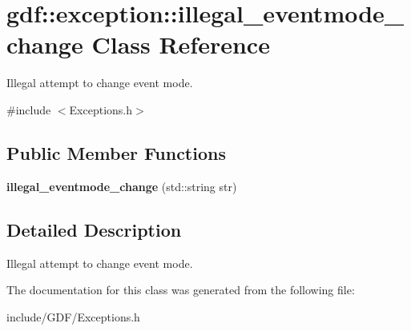 \hypertarget{classgdf_1_1exception_1_1illegal__eventmode__change}{
\section{gdf::exception::illegal\_\-eventmode\_\-change Class Reference}
\label{classgdf_1_1exception_1_1illegal__eventmode__change}
}


Illegal attempt to change event mode.  




{\ttfamily \#include $<$Exceptions.h$>$}

\subsection*{Public Member Functions}
\begin{DoxyCompactItemize}
\item 
\hypertarget{classgdf_1_1exception_1_1illegal__eventmode__change_ade675c9801b3f6cf5f8664a41b13abfb}{
{\bfseries illegal\_\-eventmode\_\-change} (std::string str)}
\label{classgdf_1_1exception_1_1illegal__eventmode__change_ade675c9801b3f6cf5f8664a41b13abfb}

\end{DoxyCompactItemize}


\subsection{Detailed Description}
Illegal attempt to change event mode. 

The documentation for this class was generated from the following file:\begin{DoxyCompactItemize}
\item 
include/GDF/Exceptions.h\end{DoxyCompactItemize}
